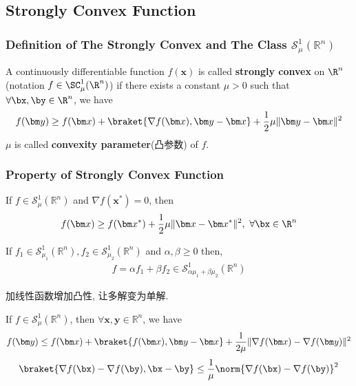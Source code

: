 \subsection{Strongly Convex Function}
\subsubsection{Definition of The Strongly Convex and The Class \texorpdfstring{$\mathcal{S}_{\mu}^1(\mathbb{R}^n)$}.}

\begin{definition}
    A continuously differentiable function $f(\bm x)$ is called \textbf{strongly convex} on $\R^n$ (notation $f\in\SC_\mu^1(\R^n)$) if there exists a constant $\mu>0$ such that $\forall \bx,\by\in\R^n$, we have
    \begin{align*}
        f(\bm y)\ge f(\bm x) +\braket{\nabla f(\bm x), \bm y-\bm x} +\frac{1}{2}\mu \|\bm y-\bm x\|^2
    \end{align*}
    $\mu$ is called \textbf{convexity parameter}(凸参数) of $f$. 
\end{definition}

\subsubsection{Property of Strongly Convex Function}

\begin{theorem}
    If $f\in \mathcal{S}_\mu^1(\mathbb{R}^n)$ and $\nabla f(\bm x^*)=0$, then 
    \begin{align*}
        f(\bm x)\ge f(\bm x^*)+\frac{1}{2}\mu\|\bm x-\bm x^*\|^2,\ \forall \bx\in\R^n
    \end{align*}
\end{theorem}

\begin{lemma}
    If $f_1\in \mathcal{S}_{\mu_1}^1(\mathbb{R}^n), f_2 \in \mathcal{S}_{\mu_2}^1(\mathbb{R}^n)$ and $\alpha,\beta\ge 0$ then,
    \begin{align*}
        f=\alpha f_1+\beta f_2\in \mathcal{S}_{\alpha \mu_1+\beta \mu _2}^1(\mathbb{R}^n)
    \end{align*}
\end{lemma}

加线性函数增加凸性, 让多解变为单解. 

\begin{theorem}
    If $f\in \mathcal{S}_\mu^1(\mathbb{R}^n)$, then $\forall \bm x,\bm y\in \mathbb{R}^n$, we have
    \begin{equation}
        f(\bm y)\le f(\bm x)+ \braket{f(\bm x),\bm y-\bm x} +\frac{1}{2\mu}\|\nabla f(\bm x)-\nabla f(\bm y)\|^2
    \end{equation}
    \begin{equation}
        \braket{\nabla f(\bx)-\nabla f(\by),\bx-\by}\le \frac{1}{\mu}\norm{\nabla f(\bx)-\nabla f(\by)}^2
    \end{equation}
\end{theorem}

